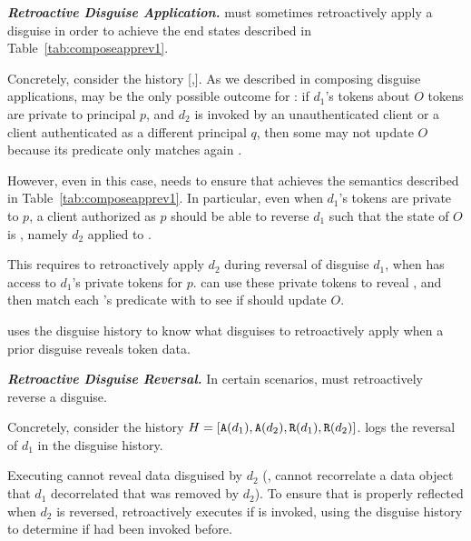 \vspace{6pt}\noindent\textbf{\emph{Retroactive Disguise Application.}}
\sys must sometimes retroactively apply a disguise in order to achieve the end states
described in Table~\ref{tab:composeapprev1}. 

Concretely, consider the history [,].  As we described in composing disguise
applications, \appcomptwo may be the only possible outcome for : if $d_1$'s tokens
about $O$ tokens are private to principal $p$, and $d_2$ is invoked by an unauthenticated client or
a client authenticated as a different principal $q$, then some  may not update $O$ because
its predicate only matches again \ohist{[\app{d_1}]}.

However, even in this case, \sys needs to ensure that 
achieves the semantics described in Table~\ref{tab:composeapprev1}. In particular, even when $d_1$'s
tokens are private to $p$, a client authorized as $p$ should be able to reverse $d_1$ such that the
state of $O$ is \ohist{[\app{d_2}]}, namely $d_2$ applied to \ostart. 

This requires \sys to retroactively apply $d_2$ during reversal of disguise $d_1$, when \sys has
access to $d_1$'s private tokens for $p$. \sys can use these private tokens to reveal \ostart, and
then match each 's predicate with \ostart to see if  should update $O$.

\sys uses the disguise history to know what disguises to retroactively apply when a prior disguise
reveals token data.

\vspace{6pt}\noindent\textbf{\emph{Retroactive Disguise Reversal.}}
In certain scenarios, \sys must retroactively reverse a disguise. 

Concretely, consider the history $H = [\texttt{A}({d_1}),\texttt{A}({d_2}),\texttt{R}({d_1}),\texttt{R}({d_2})]$.
\sys logs the reversal of $d_1$ in the disguise history. 

Executing  cannot reveal data disguised by $d_2$ (\eg,  cannot recorrelate a data
object that $d_1$ decorrelated that was removed by $d_2$). To ensure that  is properly
reflected when $d_2$ is reversed, \sys retroactively executes  if  is invoked,
using the disguise history to determine if  had been invoked before.

